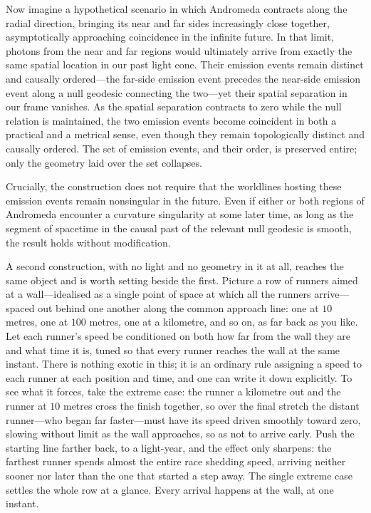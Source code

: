 \documentclass[11pt,a4paper]{article}
\theoremstyle{plain}
\theoremstyle{remark}
\begin{document}
Now imagine a hypothetical scenario in which Andromeda contracts along the radial direction, bringing its near and far sides increasingly close together, asymptotically approaching coincidence in the infinite future. In that limit, photons from the near and far regions would ultimately arrive from exactly the same spatial location in our past light cone. Their emission events remain distinct and causally ordered---the far-side emission event precedes the near-side emission event along a null geodesic connecting the two---yet their spatial separation in our frame vanishes. As the spatial separation contracts to zero while the null relation is maintained, the two emission events become coincident in both a practical and a metrical sense, even though they remain topologically distinct and causally ordered. The set of emission events, and their order, is preserved entire; only the geometry laid over the set collapses.

Crucially, the construction does not require that the worldlines hosting these emission events remain nonsingular in the future. Even if either or both regions of Andromeda encounter a curvature singularity at some later time, as long as the segment of spacetime in the causal past of the relevant null geodesic is smooth, the result holds without modification.

A second construction, with no light and no geometry in it at all, reaches the same object and is worth setting beside the first. Picture a row of runners aimed at a wall---idealised as a single point of space at which all the runners arrive---spaced out behind one another along the common approach line: one at $10$ metres, one at $100$ metres, one at a kilometre, and so on, as far back as you like. Let each runner's speed be conditioned on both how far from the wall they are and what time it is, tuned so that every runner reaches the wall at the same instant. There is nothing exotic in this; it is an ordinary rule assigning a speed to each runner at each position and time, and one can write it down explicitly. To see what it forces, take the extreme case: the runner a kilometre out and the runner at $10$ metres cross the finish together, so over the final stretch the distant runner---who began far faster---must have its speed driven smoothly toward zero, slowing without limit as the wall approaches, so as not to arrive early. Push the starting line farther back, to a light-year, and the effect only sharpens: the farthest runner spends almost the entire race shedding speed, arriving neither sooner nor later than the one that started a step away. The single extreme case settles the whole row at a glance. Every arrival happens at the wall, at one instant.
\end{document}
